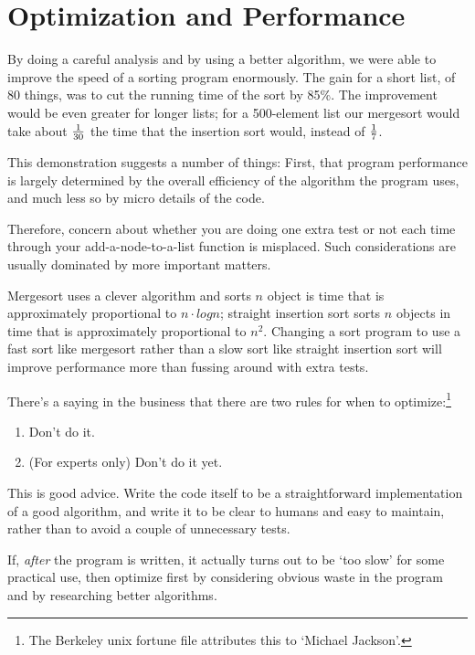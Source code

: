 \section{Optimization and Performance}

By doing a careful analysis and by using a better algorithm, we were
able to improve the speed of a sorting program enormously.  The gain for
a short list, of 80 things, was to cut the running time of the sort by
85\%.  The improvement would be even greater for longer lists; for a
500-element list our mergesort would take about $1\over 30$ the time
that the insertion sort would, instead of $ 1\over 7$.

This demonstration suggests a number of things:  First, that program
performance is largely determined by the overall efficiency of the
algorithm the program uses, and much less so by micro details of the
code.  

Therefore, concern about whether you are doing one extra test or not
each time through your add-a-node-to-a-list function is misplaced.  Such
considerations are usually dominated by more important matters.

Mergesort uses a clever algorithm and sorts $n$ object is time that is
approximately proportional to $n \cdot log n$; straight insertion sort
sorts $n$ objects in time that is approximately proportional to $n^2$.
Changing a sort program to use a fast sort like mergesort rather than a
slow sort like straight insertion sort will improve performance more
than fussing around with extra tests.

There's a saying in the business that there are two rules for when to
optimize:\footnote{The Berkeley {\sc unix} fortune file attributes this
to `Michael Jackson'.}

\begin{enumerate}
\item Don't do it.
\item (For experts only)  Don't do it yet.
\end{enumerate}

This is good advice.  Write the code itself to be a straightforward
implementation of a good algorithm, and write it to be clear to humans
and easy to maintain, rather than to avoid a couple of unnecessary
tests.

If, {\em after}\/ the program is written, it actually turns out to be
`too slow' for some practical use, then optimize first by considering
obvious waste in the program and by researching better algorithms.

